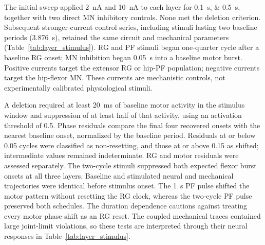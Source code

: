 The initial sweep applied \qty{+2}{\nano\ampere} and \qty{+10}{\nano\ampere} to each layer for \qtylist{0.1;0.5}{\second}, together with two direct MN inhibitory controls. None met the deletion criterion. Subsequent stronger-current control series, including stimuli lasting two baseline periods (\qty{3.876}{\second}), retained the same circuit and mechanical parameters (Table~\ref{tab:layer_stimulus}). RG and PF stimuli began one-quarter cycle after a baseline RG onset; MN inhibition began \qty{0.05}{\second} into a baseline motor burst. Positive currents target the extensor RG or hip-PF population; negative currents target the hip-flexor MN. These currents are mechanistic controls, not experimentally calibrated physiological stimuli.

A deletion required at least \qty{20}{\milli\second} of baseline motor activity in the stimulus window and suppression of at least half of that activity, using an activation threshold of 0.5. Phase residuals compare the final four recovered onsets with the nearest baseline onset, normalized by the baseline period. Residuals at or below 0.05 cycles were classified as non-resetting, and those at or above 0.15 as shifted; intermediate values remained indeterminate. RG and motor residuals were assessed separately. The two-cycle stimuli suppressed both expected flexor burst onsets at all three layers. Baseline and stimulated neural and mechanical trajectories were identical before stimulus onset. The \qty{1}{\second} PF pulse shifted the motor pattern without resetting the RG clock, whereas the two-cycle PF pulse preserved both schedules. The duration dependence cautions against treating every motor phase shift as an RG reset. The coupled mechanical traces contained large joint-limit violations, so these tests are interpreted through their neural responses in Table~\ref{tab:layer_stimulus}.


